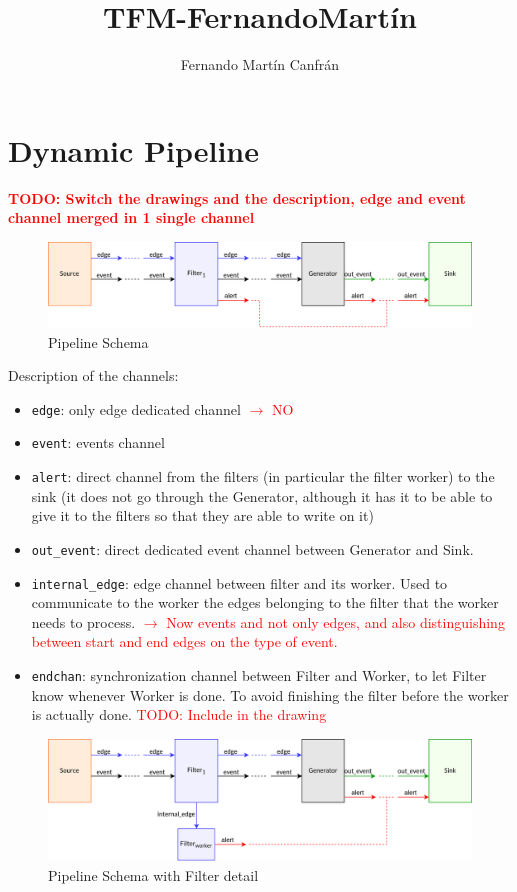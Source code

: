 \documentclass{article}
\title{TFM-FernandoMartín}
\author{Fernando Martín Canfrán}
\begin{document}
\section{Dynamic Pipeline}

\textcolor{red}{\textbf{TODO: Switch the drawings and the description, edge and event channel merged in 1 single channel}}\\

\begin{figure}[H]
    \centering
    \includegraphics[scale = 0.7]{images/pipeline-schema.png}
    \caption{Pipeline Schema}
    \label{img:pipeline-schema}
\end{figure}

Description of the channels:
\begin{itemize}
    \item \texttt{edge}: only edge dedicated channel \textcolor{red}{$\rightarrow$ NO}
    \item \texttt{event}: events channel
    \item \texttt{alert}: direct channel from the filters (in particular the filter worker) to the sink (it does not go through the Generator, although it has it to be able to give it to the filters so that they are able to write on it)
    \item \texttt{out\_event}: direct dedicated event channel between Generator and Sink.
    \item \texttt{internal\_edge}: edge channel between filter and its worker. Used to communicate to the worker the edges belonging to the filter that the worker needs to process. \textcolor{red}{$\rightarrow$ Now events and not only edges, and also distinguishing between start and end edges on the type of event.}
    \item \texttt{endchan}: synchronization channel between Filter and Worker, to let Filter know whenever Worker is done. To avoid finishing the filter before the worker is actually done. \textcolor{red}{TODO: Include in the drawing}
  \end{itemize}


\begin{figure}[H]
  \centering
  \includegraphics[scale = 0.7]{images/pipeline-schema-filter-detail.png}
  \caption{Pipeline Schema with Filter detail}
  \label{img:pipeline-schema}
\end{figure}
\end{document}
